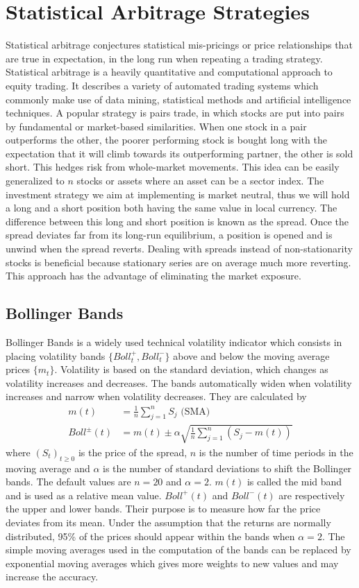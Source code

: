 \documentclass[11pt,a4,twosided,singlespacing,titlepagenumber=on]{scrreprt}
\numberwithin{equation}{chapter} %
\theoremstyle{remark}
\begin{document}
\chapter{Statistical Arbitrage Strategies}
Statistical arbitrage conjectures statistical mis-pricings or price relationships that are true in expectation, in the long run when repeating a trading strategy. Statistical arbitrage is a heavily quantitative and computational approach to equity trading. It describes a variety of automated trading systems which commonly make use of data mining, statistical methods and artificial intelligence techniques. A popular strategy is pairs trade, in which stocks are put into pairs by fundamental or market-based similarities. When one stock in a pair outperforms the other, the poorer performing stock is bought long with the expectation that it will climb towards its outperforming partner, the other is sold short. This hedges risk from whole-market movements. This idea can be easily generalized to $n$ stocks or assets where an asset can be a sector index. The investment strategy we aim at implementing is market neutral, thus we will hold a long and a short position both having the same value in local currency. The difference between this long and short position is known as the spread. Once the spread deviates far from its long-run equilibrium, a position is opened and is unwind when the spread reverts. Dealing with spreads instead of non-stationarity stocks is beneficial because stationary series are on average much more reverting. This approach has the advantage of eliminating the market exposure.

\section{Bollinger Bands}
Bollinger Bands is a widely used technical volatility indicator which consists in placing volatility bands $\{Boll^+_t, Boll^-_t\}$ above and below the moving average prices $\{m_t\}$. Volatility is based on the standard deviation, which changes as volatility increases and decreases. The bands automatically widen when volatility increases and narrow when volatility decreases. They are calculated by
\begin{align*}
m(t) &= \frac{1}{n}\sum_{j=1}^n S_j \text{ (SMA)} \\
Boll^\pm(t) &= m(t) \pm \alpha \sqrt{\frac{1}{n} \sum_{j=1}^n \left(S_j - m(t) \right)}
\end{align*}
where $(S_t)_{t \geq 0}$ is the price of the spread, $n$ is the number of time periods in the moving average and $\alpha$ is the number of standard deviations to shift the Bollinger bands. The default values are $n = 20$ and $\alpha = 2$. $m(t)$ is called the mid band and is used as a relative mean value. $Boll^+(t)$ and $Boll^-(t)$ are respectively the upper and lower bands. Their purpose is to measure how far the price deviates from its mean. Under the assumption that the returns are normally distributed, 95\% of the prices should appear within the bands when $\alpha = 2$. The simple moving averages used in the computation of the bands can be replaced by exponential moving averages which gives more weights to new values and may increase the accuracy.
\end{document}
